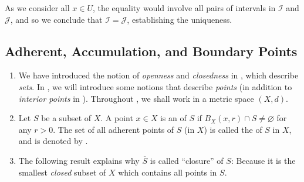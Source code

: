 \begin{enumerate}
\begin{pf}
As we consider all \(x\in U\), the equality would involve all pairs of
intervals in \(\mathcal{I}\) and \(\mathcal{J}\), and so we conclude that
\(\mathcal{I}=\mathcal{J}\), establishing the uniqueness.
\end{pf}
\end{enumerate}
\subsection{Adherent, Accumulation, and Boundary Points}
\label{subsect:adher-accum-bound-pts}
\begin{enumerate}
\item We have introduced the notion of \emph{openness} and \emph{closedness} in
, which describe \emph{sets}. In
, we will introduce some notions that
describe \emph{points} (in addition to \emph{interior points} in
). Throughout
, we shall work in a metric space
\((X,d)\).

\item Let \(S\) be a subset of \(X\). A point \(x\in X\) is an  of \(S\) if \(B_X(x,r)\cap S\ne\varnothing\) for any \(r>0\). The set of
all adherent points of \(S\) (in \(X\)) is called the  of \(S\)
in \(X\), and is denoted by .
\begin{center}
\end{center}

\item The following result explains why \(\overline{S}\) is called ``closure''
of \(S\): Because it is the smallest \emph{closed} subset of \(X\) which
contains all points in \(S\).


\end{enumerate}

